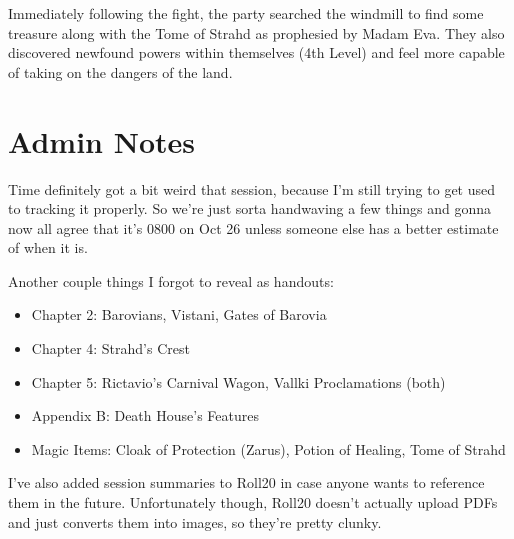 \documentclass[a4paper,11pt]{article}
\begin{document}
Immediately following the fight, the party searched the windmill to find some treasure along with the Tome of 
Strahd as prophesied by Madam Eva. They also discovered newfound powers within themselves (4th Level) and feel 
more capable of taking on the dangers of the land.

\section{Admin Notes}
Time definitely got a bit weird that session, because I'm still trying to get used to tracking it properly. So 
we're just sorta handwaving a few things and gonna now all agree that it's 0800 on Oct 26 unless someone else has 
a better estimate of when it is.

Another couple things I forgot to reveal as handouts:
\begin{itemize}
  \item Chapter 2: Barovians, Vistani, Gates of Barovia
  \item Chapter 4: Strahd's Crest
  \item Chapter 5: Rictavio's Carnival Wagon, Vallki Proclamations (both)
  \item Appendix B: Death House's Features
  \item Magic Items: Cloak of Protection (Zarus), Potion of Healing, Tome of Strahd
\end{itemize}
I've also added session summaries to Roll20 in case anyone wants to reference them in the future. Unfortunately though, Roll20 doesn't actually upload PDFs and just converts them into images, so they're pretty clunky.
\end{document}
